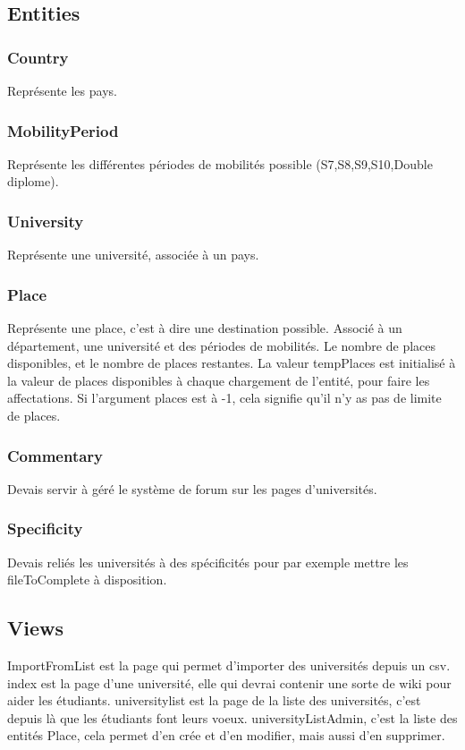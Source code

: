 \subsection{Entities}
\subsubsection{Country}
Représente les pays.

\subsubsection{MobilityPeriod}
Représente les différentes périodes de mobilités possible (S7,S8,S9,S10,Double diplome).

\subsubsection{University}
Représente une université, associée à un pays.

\subsubsection{Place}
Représente une place, c'est à dire une destination possible. Associé à un département, une université et des périodes de mobilités. Le nombre de places disponibles, et le nombre de places restantes. La valeur tempPlaces est initialisé à la valeur de places disponibles à chaque chargement de l'entité, pour faire les affectations.
Si l'argument places est à -1, cela signifie qu'il n'y as pas de limite de places.


\subsubsection{Commentary}
Devais servir à géré le système de forum sur les pages d'universités.

\subsubsection{Specificity}
Devais reliés les universités à des spécificités pour par exemple mettre les fileToComplete à disposition.

\subsection{Views}
ImportFromList est la page qui permet d'importer des universités depuis un csv.
index est la page d'une université, elle qui devrai contenir une sorte de wiki pour aider les étudiants.
universitylist est la page de la liste des universités, c'est depuis là que les étudiants font leurs voeux.
universityListAdmin, c'est la liste des entités Place, cela permet d'en crée et d'en modifier, mais aussi d'en supprimer.

